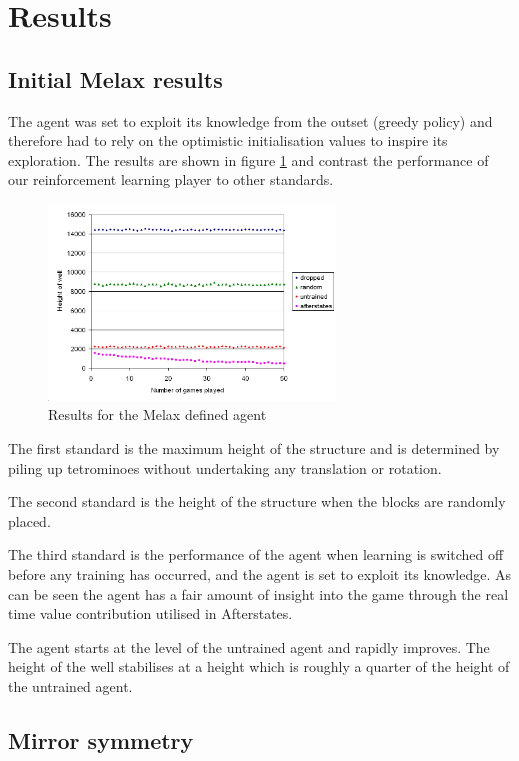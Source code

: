 \documentclass{rucsthesis}
\begin{document}
\section{Results}

\subsection{Initial Melax results}

The agent was set to exploit its knowledge from the outset (greedy policy) and therefore had to rely on the optimistic initialisation values to inspire its exploration. The results are shown in figure \ref{fig:mymelaxresults} and contrast the performance of our reinforcement learning player to other standards. 

\begin{figure}[h]
\centering
\includegraphics[width=3in]{mymelaxresults.png}
\caption{Results for the Melax defined agent}
\label{fig:mymelaxresults}
\end{figure}

The first standard is the maximum height of the structure and is determined by piling up tetrominoes without undertaking any translation or rotation.

The second standard is the height of the structure when the blocks are randomly placed.

The third standard is the performance of the agent when learning is switched off before any training has occurred, and the agent is set to exploit its knowledge. As can be seen the agent has a fair amount of insight into the game through the real time value contribution utilised in Afterstates. 

The agent starts at the level of the untrained agent and rapidly improves. The height of the well stabilises at a height which is roughly a quarter of the height of the untrained agent.

\subsection{Mirror symmetry}
\end{document}
